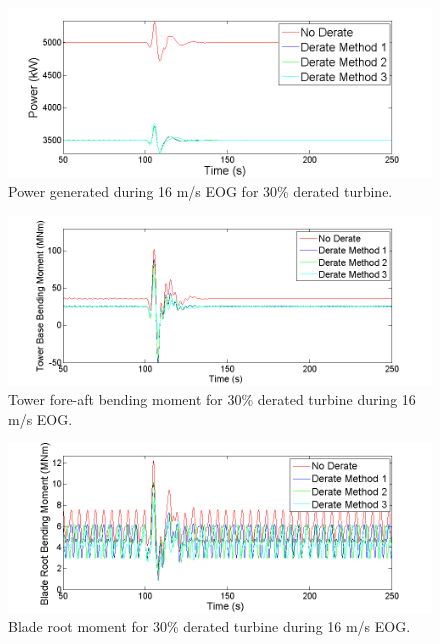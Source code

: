 \begin{figure}[htb]
	\centering
		\includegraphics[width = \linewidth]{Figures/ch4Figures/fig4-1.png}
		 
	\caption{Power generated during 16 m/s EOG for 30\% derated turbine.}
	\label{fig4-1}
\end{figure}

\begin{figure}[htb]
	\centering
		\includegraphics[width = \linewidth]{Figures/ch4Figures/fig4-2.png}
		 
	\caption{Tower fore-aft bending moment for 30\% derated turbine during 16 m/s EOG.}
	\label{fig4-2}
\end{figure}

\begin{figure}[htbp]
	\centering
		\includegraphics[width = \linewidth]{Figures/ch4Figures/fig4-3.png}
		 
	\caption{Blade root moment for 30\% derated turbine during 16 m/s EOG.}
	\label{fig4-3}
\end{figure}

